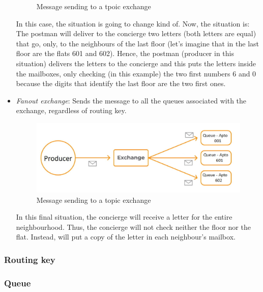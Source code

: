 \documentclass[4paper,12pt]{article}
\begin{document}
\begin{itemize}
\begin{figure}[H]
        \caption{Message sending to a tpoic exchange}
        \label{fig:topic_exchange}
    \end{figure}
    In this case, the situation is going to change kind of. Now, the situation is: The postman will deliver to the concierge two letters (both letters are equal) that go, only, to the neighbours of the last floor (let's imagine that in the last floor are the flats 601 and 602). Hence, the postman (producer in this situation) delivers the letters to the concierge and this puts the letters inside the mailboxes, only checking (in this example) the two first numbers 6 and 0 because the digits that identify the last floor are the two first ones.
    \item \textit{Fanout exchange}: Sends the message to all the queues associated with the exchange, regardless of routing key.
    \begin{figure}[H]
        \centering
        \includegraphics[scale = 0.4]{Images/fanout_exchange.jpg}
        \caption{Message sending to a topic exchange}
        \label{fig:topic_exchange}
    \end{figure}
    \newpage
    In this final situation, the concierge will receive a letter for the entire neighbourhood. Thus, the concierge will not check neither the floor nor the flat. Instead, will put a copy of the letter in each neighbour's mailbox.
\end{itemize}

\subsubsection*{Routing key}

\subsubsection*{Queue}
\end{document}
